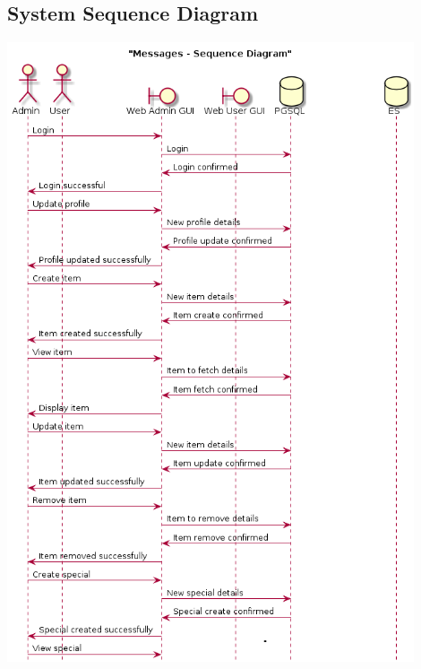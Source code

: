 \documentclass[a4paper,10pt]{article}
\begin{document}
\subsection{System Sequence Diagram}
\includegraphics[width=12cm]{System_Sequence_Diagram_1.png}
\newpage
\end{document}
